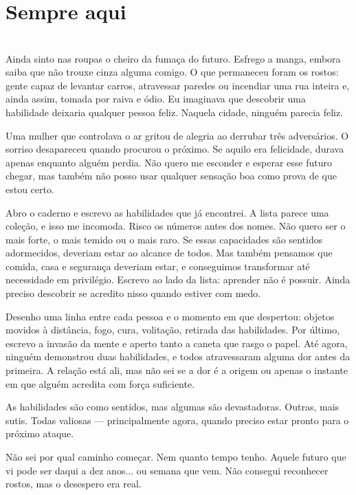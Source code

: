 \newpage

\ifdefined\useChapters
\chapter{Sempre aqui}
\else
\chapter{}
\fi

Ainda sinto nas roupas o cheiro da fumaça do futuro. Esfrego a manga, embora saiba que não trouxe cinza alguma comigo. O que permaneceu foram os rostos: gente capaz de levantar carros, atravessar paredes ou incendiar uma rua inteira e, ainda assim, tomada por raiva e ódio. Eu imaginava que descobrir uma habilidade deixaria qualquer pessoa feliz. Naquela cidade, ninguém parecia feliz.

Uma mulher que controlava o ar gritou de alegria ao derrubar três adversários. O sorriso desapareceu quando procurou o próximo. Se aquilo era felicidade, durava apenas enquanto alguém perdia. Não quero me esconder e esperar esse futuro chegar, mas também não posso usar qualquer sensação boa como prova de que estou certo.

Abro o caderno e escrevo as habilidades que já encontrei. A lista parece uma coleção, e isso me incomoda. Risco os números antes dos nomes. Não quero ser o mais forte, o mais temido ou o mais raro. Se essas capacidades são sentidos adormecidos, deveriam estar ao alcance de todos. Mas também pensamos que comida, casa e segurança deveriam estar, e conseguimos transformar até necessidade em privilégio. Escrevo ao lado da lista: aprender não é possuir. Ainda preciso descobrir se acredito nisso quando estiver com medo.

Desenho uma linha entre cada pessoa e o momento em que despertou: objetos movidos à distância, fogo, cura, volitação, retirada das habilidades. Por último, escrevo a invasão da mente e aperto tanto a caneta que rasgo o papel. Até agora, ninguém demonstrou duas habilidades, e todos atravessaram alguma dor antes da primeira. A relação está ali, mas não sei se a dor é a origem ou apenas o instante em que alguém acredita com força suficiente.

As habilidades são como sentidos, mas algumas são devastadoras. Outras, mais sutis. Todas valiosas — principalmente agora, quando preciso estar pronto para o próximo ataque.

Não sei por qual caminho começar. Nem quanto tempo tenho. Aquele futuro que vi pode ser daqui a dez anos... ou semana que vem.  
Não consegui reconhecer rostos, mas o desespero era real.

